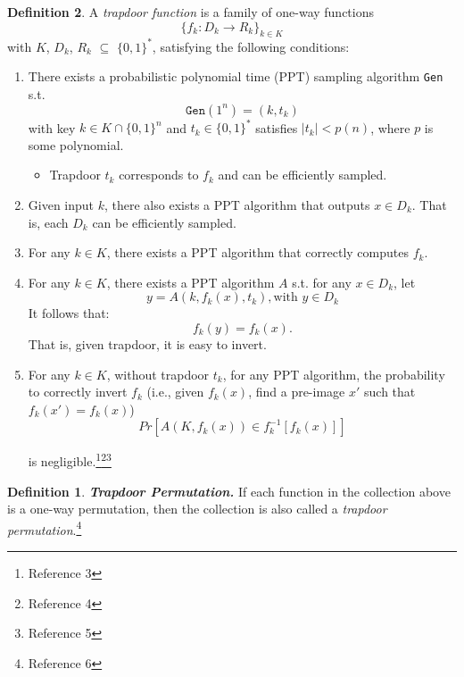 \documentclass[]{final_report}
\theoremstyle{definition}
\newtheorem{definition}{Definition}[chapter]
\begin{document}
\begin{definition} 
A \textit{trapdoor function} is a family of one-way functions 
\[\{ f_k : D_k \rightarrow R_k \}_{k \in K}\]
with \(K\), \(D_k\), \(R_k\) $\subseteq$ \(\{0, 1\}^*\), satisfying the following conditions:

\begin{enumerate}
    \item There exists a probabilistic polynomial time (PPT) sampling algorithm \texttt{Gen} s.t. 
    \[\texttt{Gen}(1^n) = (k, t_k)\] 
    with key \(k \in K \cap \{0, 1\}^n\) and \(t_k \in \{0, 1\}^*\) satisfies \(| t_k | < p (n)\), where \(p\) is some polynomial. 
    \begin{itemize}
    \item Trapdoor \(t_k\) corresponds to $f_k$ and can be efficiently sampled.
    \end{itemize}
    
    \item Given input \(k\), there also exists a PPT algorithm that outputs \(x \in D_k\). That is, each \(D_k\) can be efficiently sampled.
    
    \item For any \(k \in K\), there exists a PPT algorithm that correctly computes \(f_k\).
    
    \item For any \(k \in K\), there exists a PPT algorithm \(A\) s.t. for any \(x \in D_k\), let 
    \[y = A ( k, f_k(x), t_k ), \text{with } y \in D_k \]
    It follows that:
    \[f_k(y) = f_k(x).\]
    That is, given trapdoor, it is easy to invert.
    
    \item For any \(k \in K\), without trapdoor \(t_k\), for any PPT algorithm, the probability to correctly invert \(f_k\) (i.e., given \(f_k(x)\), find a pre-image \(x'\) such that \(f_k(x' ) = f_k(x)\)) 
    \[Pr[A(K, f_k(x)) \in f_{k}^{-1}[f_k(x)]]\] 
    
    is negligible.\footnote{Reference 3}\footnote{Reference 4}\footnote{Reference 5}
\end{enumerate}
\begin{definition} 
\textit{\textbf{Trapdoor Permutation.}} If each function in the collection above is a one-way permutation, then the collection is also called a \textit{trapdoor permutation}.\footnote{Reference 6}
\end{definition} 
\end{definition}
\end{document}

